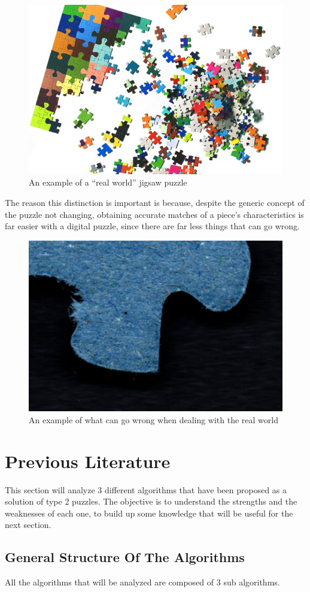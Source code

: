 \documentclass{article}
\begin{document}
\begin{figure}[h]
    \caption{An example of a “real world” jigsaw  puzzle}\label{fig:figure_real_puzzle}
    \includegraphics[height=0.25\textwidth]{pictures/real_puzzle.jpg}
    \centering

\end{figure}

The reason this distinction is important is because,
despite the generic concept of the puzzle not changing,
obtaining accurate matches of a piece's characteristics
is far easier with a digital puzzle,
since there are far less things that can go wrong.


\begin{figure}[h]
    \caption{An example of what can go wrong when dealing with the real world}\label{fig:figure_measurement_error}
    \includegraphics[height=0.25\textwidth]{pictures/example_bad_piece.jpg}
    \centering

\end{figure}

\section{Previous Literature}
This section will analyze 3 different algorithms that have been proposed
as a solution of type 2 puzzles. The objective is to understand the
strengths and the weaknesses of each one, to build up some knowledge
that will be useful for the next section.

\subsection{General Structure Of The Algorithms}

All the algorithms that will be analyzed are composed of 3 sub algorithms.
\end{document}
